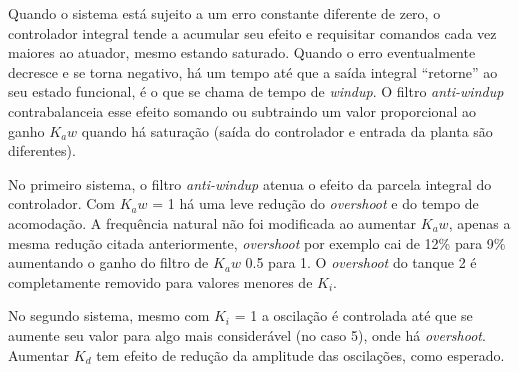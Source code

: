 Quando o sistema está sujeito a um erro constante diferente de zero, o controlador integral tende a acumular seu efeito e requisitar comandos cada vez maiores ao atuador, mesmo estando saturado. Quando o erro eventualmente decresce e se torna negativo, há um tempo até que a saída integral “retorne” ao seu estado funcional, é o que se chama de tempo de \emph{windup}. O filtro \emph{anti-windup} contrabalanceia esse efeito somando ou subtraindo um valor proporcional ao ganho $K_aw$ quando há saturação (saída do controlador e entrada da planta são diferentes).

No primeiro sistema, o filtro \emph{anti-windup} atenua o efeito da parcela integral do controlador. Com $K_aw$ = 1 há uma leve redução do \emph{overshoot} e do tempo de acomodação. A frequência natural não foi modificada ao aumentar $K_aw$, apenas a mesma redução citada anteriormente, \emph{overshoot} por exemplo cai de 12\% para 9\%  aumentando o ganho do filtro de $K_aw$ 0.5 para 1. O \emph{overshoot} do tanque 2 é completamente removido para valores menores de $K_i$.

No segundo sistema, mesmo com $K_i$ = 1 a oscilação é controlada até que se aumente seu valor para algo mais considerável (no caso 5), onde há \emph{overshoot}. Aumentar $K_d$ tem efeito de redução da amplitude das oscilações, como esperado.


